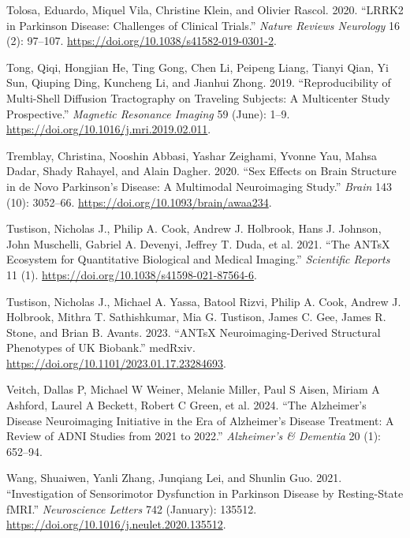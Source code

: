 \documentclass[
  table]{article}
\newlength{\cslhangindent}
\newenvironment{CSLReferences}[2] %
 {\begin{list}{}{%
  \setlength{\itemindent}{0pt}
  \setlength{\leftmargin}{0pt}
  \setlength{\parsep}{0pt}
  \ifodd #1
   \setlength{\leftmargin}{\cslhangindent}
   \setlength{\itemindent}{-1\cslhangindent}
  \fi
  \setlength{\itemsep}{#2\baselineskip}}}
 {\end{list}}
\begin{document}
\begin{CSLReferences}{1}{0}
Tolosa, Eduardo, Miquel Vila, Christine Klein, and Olivier Rascol. 2020.
{``{LRRK2} in {Parkinson} Disease: Challenges of Clinical Trials.''}
\emph{Nature Reviews Neurology} 16 (2): 97--107.
\url{https://doi.org/10.1038/s41582-019-0301-2}.

Tong, Qiqi, Hongjian He, Ting Gong, Chen Li, Peipeng Liang, Tianyi Qian,
Yi Sun, Qiuping Ding, Kuncheng Li, and Jianhui Zhong. 2019.
{``Reproducibility of Multi-Shell Diffusion Tractography on Traveling
Subjects: {A} Multicenter Study Prospective.''} \emph{Magnetic Resonance
Imaging} 59 (June): 1--9.
\url{https://doi.org/10.1016/j.mri.2019.02.011}.

Tremblay, Christina, Nooshin Abbasi, Yashar Zeighami, Yvonne Yau, Mahsa
Dadar, Shady Rahayel, and Alain Dagher. 2020. {``Sex Effects on Brain
Structure in de Novo {Parkinson}{'}s Disease: A Multimodal Neuroimaging
Study.''} \emph{Brain} 143 (10): 3052--66.
\url{https://doi.org/10.1093/brain/awaa234}.

Tustison, Nicholas J., Philip A. Cook, Andrew J. Holbrook, Hans J.
Johnson, John Muschelli, Gabriel A. Devenyi, Jeffrey T. Duda, et al.
2021. {``The {ANTsX} Ecosystem for Quantitative Biological and Medical
Imaging.''} \emph{Scientific Reports} 11 (1).
\url{https://doi.org/10.1038/s41598-021-87564-6}.

Tustison, Nicholas J., Michael A. Yassa, Batool Rizvi, Philip A. Cook,
Andrew J. Holbrook, Mithra T. Sathishkumar, Mia G. Tustison, James C.
Gee, James R. Stone, and Brian B. Avants. 2023. {``{ANTsX}
Neuroimaging-Derived Structural Phenotypes of {UK} {Biobank}.''}
medRxiv. \url{https://doi.org/10.1101/2023.01.17.23284693}.

Veitch, Dallas P, Michael W Weiner, Melanie Miller, Paul S Aisen, Miriam
A Ashford, Laurel A Beckett, Robert C Green, et al. 2024. {``The
Alzheimer's Disease Neuroimaging Initiative in the Era of Alzheimer's
Disease Treatment: A Review of ADNI Studies from 2021 to 2022.''}
\emph{Alzheimer's \& Dementia} 20 (1): 652--94.

Wang, Shuaiwen, Yanli Zhang, Junqiang Lei, and Shunlin Guo. 2021.
{``Investigation of Sensorimotor Dysfunction in {Parkinson} Disease by
Resting-State {fMRI}.''} \emph{Neuroscience Letters} 742 (January):
135512. \url{https://doi.org/10.1016/j.neulet.2020.135512}.


\end{CSLReferences}
\end{document}
